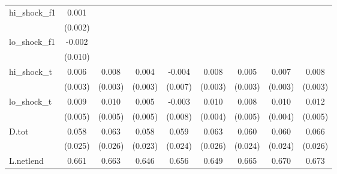 {\begin{tabular}{l*{8}{c}}
\addlinespace
hi\_shock\_f1 &       0.001         &                     &                     &                     &                     &                     &                     &                     \\
            &     (0.002)         &                     &                     &                     &                     &                     &                     &                     \\
\addlinespace
lo\_shock\_f1 &      -0.002         &                     &                     &                     &                     &                     &                     &                     \\
            &     (0.010)         &                     &                     &                     &                     &                     &                     &                     \\
\addlinespace
hi\_shock\_t  &       0.006\sym{*}  &       0.008\sym{**} &       0.004         &      -0.004         &       0.008\sym{**} &       0.005         &       0.007\sym{**} &       0.008\sym{**} \\
            &     (0.003)         &     (0.003)         &     (0.003)         &     (0.007)         &     (0.003)         &     (0.003)         &     (0.003)         &     (0.003)         \\
\addlinespace
lo\_shock\_t  &       0.009\sym{*}  &       0.010\sym{*}  &       0.005         &      -0.003         &       0.010\sym{**} &       0.008         &       0.010\sym{**} &       0.012\sym{**} \\
            &     (0.005)         &     (0.005)         &     (0.005)         &     (0.008)         &     (0.004)         &     (0.005)         &     (0.004)         &     (0.005)         \\
\addlinespace
D.tot       &       0.058\sym{**} &       0.063\sym{**} &       0.058\sym{**} &       0.059\sym{**} &       0.063\sym{**} &       0.060\sym{**} &       0.060\sym{**} &       0.066\sym{**} \\
            &     (0.025)         &     (0.026)         &     (0.023)         &     (0.024)         &     (0.026)         &     (0.024)         &     (0.024)         &     (0.026)         \\
\addlinespace
L.netlend   &       0.661\sym{***}&       0.663\sym{***}&       0.646\sym{***}&       0.656\sym{***}&       0.649\sym{***}&       0.665\sym{***}&       0.670\sym{***}&       0.673\sym{***}\\

\end{tabular}}
